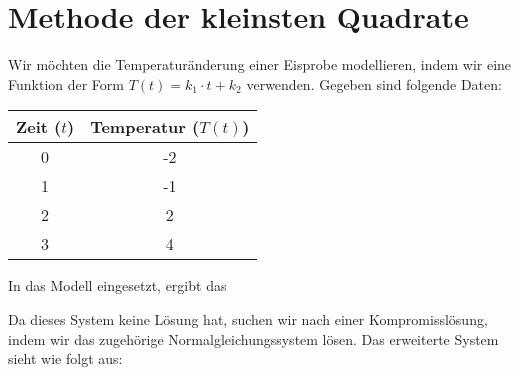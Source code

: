 \documentclass[11pt, openany]{book}
\begin{document}
\section{Methode der kleinsten Quadrate}

Wir möchten die Temperaturänderung einer Eisprobe modellieren, indem wir eine Funktion der Form $T(t) = k_1 \cdot t + k_2$ verwenden. Gegeben sind folgende Daten:
\begin{center}
\begin{tabular}{c|c}
Zeit ($t$) & Temperatur ($T(t)$) \\ \hline
0          & -2                 \\
1          & -1                 \\
2          & 2                  \\
3          & 4                  \\
\end{tabular}
\end{center}
In das Modell eingesetzt, ergibt das

\begin{center}
\end{center}

Da dieses System keine Lösung hat, suchen wir nach einer Kompromisslösung, indem wir das zugehörige Normalgleichungssystem lösen. Das erweiterte System sieht wie folgt aus:
\end{document}
